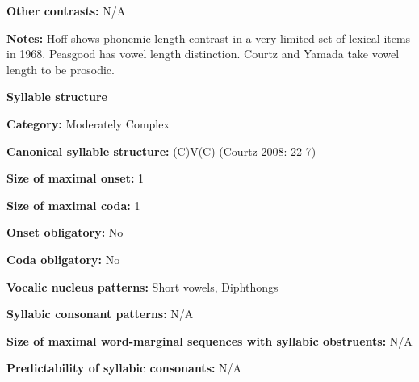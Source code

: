 \begin{styleBody}
\textbf{Other contrasts:} N/A
\end{styleBody}

\begin{styleBody}
\textbf{Notes: }Hoff shows phonemic length contrast in a very limited set of lexical items in 1968. Peasgood has vowel length distinction. Courtz and Yamada take vowel length to be prosodic.
\end{styleBody}

\begin{styleBody}
\textbf{Syllable structure}
\end{styleBody}

\begin{styleBody}
\textbf{Category:} Moderately Complex
\end{styleBody}

\begin{styleBody}
\textbf{Canonical syllable structure:} (C)V(C) (Courtz 2008: 22-7)
\end{styleBody}

\begin{styleBody}
\textbf{Size of maximal onset:} 1
\end{styleBody}

\begin{styleBody}
\textbf{Size of maximal coda:} 1
\end{styleBody}

\begin{styleBody}
\textbf{Onset obligatory:} No
\end{styleBody}

\begin{styleBody}
\textbf{Coda obligatory:} No
\end{styleBody}

\begin{styleBody}
\textbf{Vocalic nucleus patterns:} Short vowels, Diphthongs
\end{styleBody}

\begin{styleBody}
\textbf{Syllabic consonant patterns:} N/A
\end{styleBody}

\begin{styleBody}
\textbf{Size of maximal word{}-marginal sequences with syllabic obstruents:} N/A
\end{styleBody}

\begin{styleBody}
\textbf{Predictability of syllabic consonants:} N/A
\end{styleBody}

